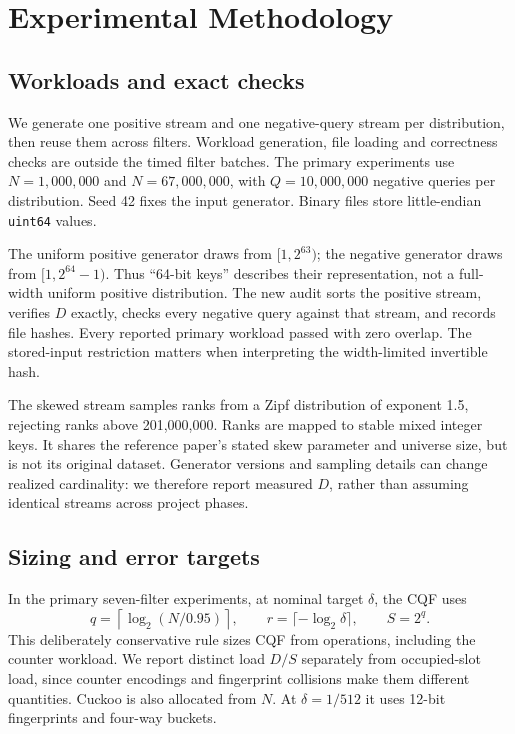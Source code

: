 \section{Experimental Methodology}
\subsection{Workloads and exact checks}
We generate one positive stream and one negative-query stream per distribution, then reuse them across filters. Workload generation, file loading and correctness checks are outside the timed filter batches. The primary experiments use $N=1{,}000{,}000$ and $N=67{,}000{,}000$, with $Q=10{,}000{,}000$ negative queries per distribution. Seed 42 fixes the input generator. Binary files store little-endian \texttt{uint64} values.

The uniform positive generator draws from $[1,2^{63})$; the negative generator draws from $[1,2^{64}-1)$. Thus ``64-bit keys'' describes their representation, not a full-width uniform positive distribution. The new audit sorts the positive stream, verifies $D$ exactly, checks every negative query against that stream, and records file hashes. Every reported primary workload passed with zero overlap. The stored-input restriction matters when interpreting the width-limited invertible hash.

The skewed stream samples ranks from a Zipf distribution of exponent 1.5, rejecting ranks above 201,000,000. Ranks are mapped to stable mixed integer keys. It shares the reference paper's stated skew parameter and universe size, but is not its original dataset. Generator versions and sampling details can change realized cardinality: we therefore report measured $D$, rather than assuming identical streams across project phases.

\begin{table}[!htbp]\centering
\caption{Audited workloads in the new primary experiments. Both scales use 10M negative queries; each complete primary configuration has three timing repetitions.}
\label{tab:workloads}

\end{table}

\subsection{Sizing and error targets}
In the primary seven-filter experiments, at nominal target $\delta$, the CQF uses
\begin{equation}
q=\left\lceil\log_2(N/0.95)\right\rceil,\qquad r=\lceil-\log_2\delta\rceil,\qquad S=2^q.
\label{eq:cqf-sizing}
\end{equation}
This deliberately conservative rule sizes CQF from operations, including the counter workload. We report distinct load $D/S$ separately from occupied-slot load, since counter encodings and fingerprint collisions make them different quantities. Cuckoo is also allocated from $N$. At $\delta=1/512$ it uses 12-bit fingerprints and four-way buckets.

